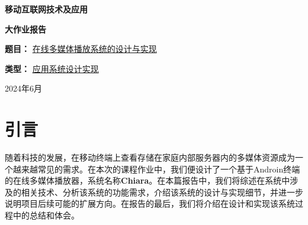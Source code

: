 \documentclass[12pt, a4paper, oneside]{ctexart}
\begin{document}
\begin{titlepage}
\begin{center}
    \Huge{\textbf{移动互联网技术及应用}}

    \vspace{2em}

    \Huge{\textbf{大作业报告}}

    \vspace{5em}
    
    \Large{\textbf{题目：} \underline{在线多媒体播放系统的设计与实现}}

    \vspace{3em}
    
    \large{\textbf{类型：} \underline{应用系统设计实现}}

\end{center}

\vspace{6em}

\begin{center}
    \large{ \underline{}}
    
    \large{ \underline{}}

    \large{ \underline{}}
\end{center}

\vspace{8em}

\begin{center}
    \Large{2024年6月}
\end{center}
\end{titlepage}

\clearpage

\setcounter{page}{1}
\tableofcontents

\clearpage
\setcounter{page}{1}

\section{引言}

随着科技的发展，在移动终端上查看存储在家庭内部服务器内的多媒体资源成为一个越来越常见的需求。在本次的课程作业中，我们便设计了一个基于Androin终端的在线多媒体播放器，系统名称\textbf{Chiara}。在本篇报告中，我们将综述在系统中涉及的相关技术、分析该系统的功能需求，介绍该系统的设计与实现细节，并进一步说明项目后续可能的扩展方向。在报告的最后，我们将介绍在设计和实现该系统过程中的总结和体会。

\clearpage



\clearpage



\clearpage



\clearpage



\clearpage



\clearpage



\clearpage



\end{document}
